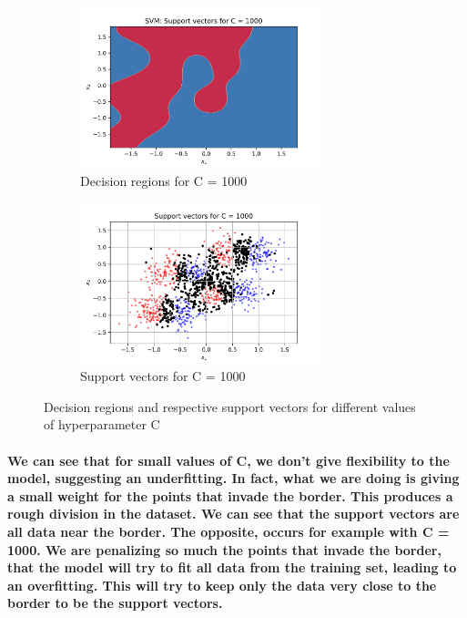 \documentclass[a4paper]{article}    %
\begin{document}
\begin{figure}[H]
\begin{subfigure}{0.45\textwidth}
        \centering
        \includegraphics[width=7cm]{decision_region_C_1000}
        \caption{Decision regions for C = 1000}
        \label{fig:svm-decision_region_C_1000}
    \end{subfigure}
    \hfill
    \begin{subfigure}{0.45\textwidth}
        \centering
        \includegraphics[width=7cm]{support_vectors_C_1000}
        \caption{Support vectors for C = 1000}
        \label{fig:svm-support_vectors_C_1000}
    \end{subfigure}
    \caption{Decision regions and respective support vectors for different values of hyperparameter C}
    \label{fig:svm-decision_regions_support_vectos_C}
\end{figure}

\paragraph{We can see that for small values of C, we don't give flexibility to the model, suggesting an underfitting. In fact, what we are doing is giving a small weight for the points that invade the border. This produces a rough division in the dataset. We can see that the support vectors are all data near the border.
    The opposite, occurs for example with C = 1000. We are penalizing so much the points that invade the border, that the model will try to fit all data from the training set, leading to an overfitting. This will try to keep only the data very close to the border to be the support vectors.}
\end{document}
